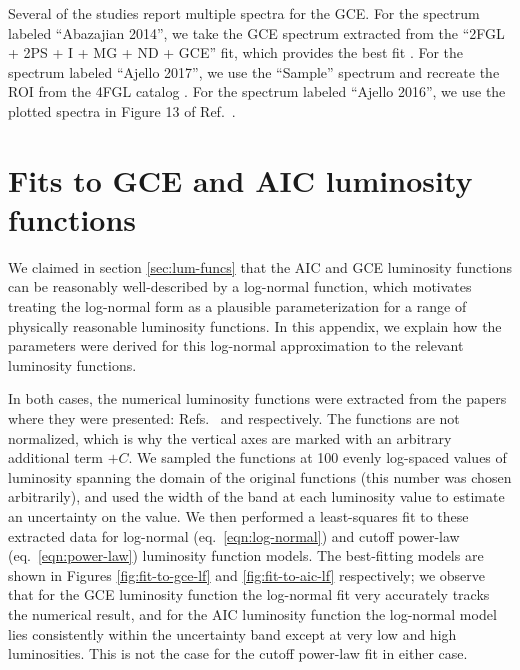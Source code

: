 \documentclass[letter,11pt]{article}
\begin{document}
Several of the studies report multiple spectra for the GCE. For the spectrum labeled ``Abazajian 2014'', we take the GCE spectrum extracted from the ``2FGL + 2PS + I + MG + ND + GCE'' fit, which provides the best fit \cite{Abazajian:2014fta}. For the spectrum labeled ``Ajello 2017'', we use the ``Sample'' spectrum and recreate the ROI from the 4FGL catalog \cite{Ajello:2017opo}. For the spectrum labeled ``Ajello 2016'', we use the plotted spectra in Figure 13 of Ref.~\cite{Ajello:2015kwa}.

\section{Fits to GCE and AIC luminosity functions}
\label{app:lum-func-fit}
We claimed in section \ref{sec:lum-funcs} that the AIC and GCE luminosity functions can be reasonably well-described by a log-normal function, which motivates treating the log-normal form as a plausible parameterization for a range of physically reasonable luminosity functions. In this appendix, we explain how the parameters were derived for this log-normal approximation to the relevant luminosity functions.

In both cases, the numerical luminosity functions were extracted from the papers where they were presented: Refs.~\cite{Ploeg:2020jeh} and \cite{Gautam:2021wqn} respectively. The functions are not normalized, which is why the vertical axes are marked with an arbitrary additional term $+C$. We sampled the functions at 100 evenly log-spaced values of luminosity spanning the domain of the original functions (this number was chosen arbitrarily), and used the width of the band at each luminosity value to estimate an uncertainty on the value. We then performed a least-squares fit to these extracted data for  log-normal (eq.~\ref{eqn:log-normal}) and cutoff power-law (eq.~\ref{eqn:power-law}) luminosity function models. The best-fitting models are shown in Figures \ref{fig:fit-to-gce-lf} and \ref{fig:fit-to-aic-lf} respectively; we observe that for the GCE luminosity function the log-normal fit very accurately tracks the numerical result, and for the AIC luminosity function the log-normal model lies consistently within the uncertainty band except at very low and high luminosities. This is not the case for the cutoff power-law fit in either case. 
\end{document}
